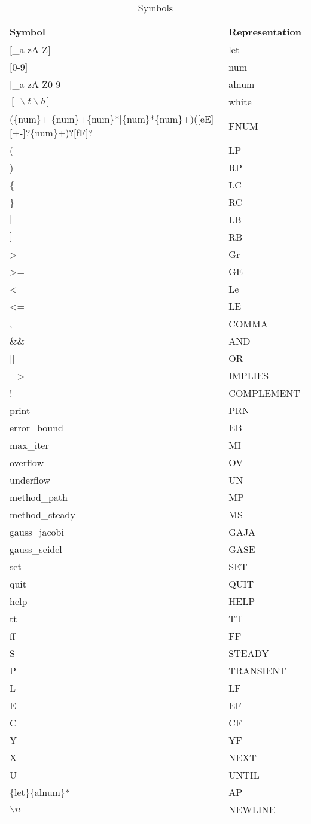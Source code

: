 \begin{table}[!ht]
\caption{Symbols}
\begin{center}
\begin{tiny}
\begin{tabular}{||l|l||}
\hline\hline
Symbol	& Representation \\
\hline $[$\_a-zA-Z$]$	&	let  \\
$[$0-9$]$	&	num  \\
$[$\_a-zA-Z0-9$]$	&	alnum  \\
$[\ \backslash t \backslash b]$	&	white  \\
(\{num\}+|\{num\}+\.\{num\}*|\{num\}*\.\{num\}+)([eE][+-]?\{num\}+)?[fF]? & FNUM  \\
(		&	LP  \\
)		&	RP  \\
\{		&	LC \\
\}		&	RC \\
$[$		&	LB \\
$]$		&	RB \\
>		&	Gr \\
>=		&	GE \\
<		&	Le \\
<=		&	LE \\
,		&	COMMA \\
\&\&		&	AND \\
||		&	OR \\
=>		&	IMPLIES \\
!		&	COMPLEMENT \\
print		&	PRN \\
error\_bound	&	EB \\
max\_iter	&	MI \\
overflow	&	OV \\
underflow	&	UN \\
method\_path	&	MP \\
method\_steady	&	MS \\
gauss\_jacobi	&	GAJA \\
gauss\_seidel	&	GASE \\
set		&	SET \\
quit		&	QUIT \\
help		&	HELP \\
tt		&	TT \\
ff		&	FF \\
S		&	STEADY \\
P		&	TRANSIENT \\
L		&	LF \\
E		&	EF \\
C		&	CF \\
Y		&	YF \\
X		&	NEXT \\
U		&	UNTIL \\
\{let\}\{alnum\}*   &	AP \\
$\backslash n$		&	NEWLINE \\
\hline \hline
\end{tabular}
\end{tiny}
\end{center}
\label{Tbl:lex}
\end{table}
